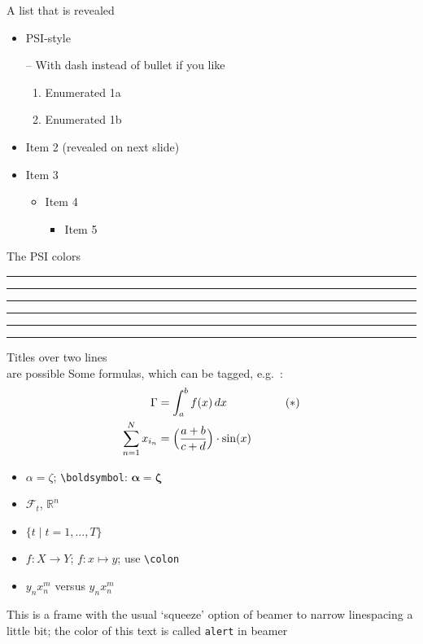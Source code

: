 \documentclass[aspectratio=169,t]{beamer}  %
\begin{document}
\begin{frame}{A list that is revealed}

  \begin{itemize}
  \item PSI-style 
  \item[--]  With dash instead of bullet if you like
    \begin{enumerate}
    \item Enumerated 1a
    \item Enumerated 1b
    \end{enumerate}
    \pause
  \item Item 2 (revealed on next slide)
    \pause
  \item Item 3
    \begin{itemize}
    \item Item 4
      \begin{itemize}
      \item Item 5
      \end{itemize}
    \end{itemize}
  \end{itemize}

\end{frame}



\begin{frame}{The PSI colors}

\textcolor{PSIgreen}{\rule{2cm}{1cm}}
\textcolor{PSIyellow}{\rule{2cm}{1cm}}
\textcolor{PSIpink}{\rule{2cm}{1cm}}
\textcolor{PSIblue}{\rule{2cm}{1cm}}
\textcolor{PSIred}{\rule{2cm}{1cm}}
\textcolor{PSIviolet}{\rule{2cm}{1cm}}


\end{frame}

\begin{frame}[squeeze]{Titles over two lines\\ are possible}
  Some formulas, which can be tagged, e.g.\ \thetag{$\ast$}:
  \begin{align*}
    \Gamma  & = \int_a^b f(x)\,dx             && \tag{$\ast$}\\
    \sum_{n=1}^N x_{i_n} &= \Bigl(\frac{a+b}{c+d}\Bigr)\cdot \sin(x)  &&
  \end{align*}
  \begin{itemize}
  \item  $\alpha = \zeta$; \texttt{\textbackslash boldsymbol}: $\boldsymbol{\alpha} = \boldsymbol{\zeta}$ 
  \item $\mathcal{F}_t$, $\mathbb{R}^n$
  \item $\{t \mid t=1,\dots,T\}$
  \item $f\colon X\to Y$; $f\colon x\mapsto y$; use \texttt{\textbackslash colon}
  \item $y_nx_n^m$ versus $y_n^{}x_n^m$
  \end{itemize}
   \alert{This is a frame with the usual `squeeze' option of beamer to narrow linespacing a little bit; the color of this text is called \texttt{alert} in beamer}
  
\end{frame}
\end{document}
